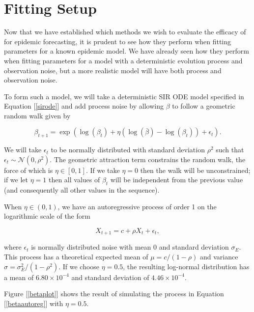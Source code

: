 

\section{Fitting Setup}

	Now that we have established which methods we wish to evaluate the efficacy of for epidemic forecasting, it is prudent to see how they perform when fitting parameters for a known epidemic model. We have already seen how they perform when fitting parameters for a model with a deterministic evolution process and observation noise, but a more realistic model will have both process and observation noise.

	To form such a model, we will take a deterministic SIR ODE model specified in Equation [\ref{sirode}] and add process noise by allowing $\beta$ to follow a geometric random walk given by

	\begin{equation}\label{betaautoreg}
		\beta_{t+1} = \exp \left( \log(\beta_{t}) + \eta (\log(\bar{\beta}) - \log(\beta_{t})) + \epsilon_{t} \right).
	\end{equation}

	We will take $\epsilon_{t}$ to be normally distributed with standard deviation $\rho^2$ such that $\epsilon_{t} \sim \mathcal{N}(0,\rho^2)$. The geometric attraction term constrains the random walk, the force of which is $\eta \in [0,1]$. If we take $\eta = 0$ then the walk will be unconstrained; if we let $\eta = 1$ then all values of $\beta_t$ will be independent from the previous value (and consequently all other values in the sequence).

	When $\eta \in (0,1)$, we have an autoregressive process of order 1 on the logarithmic scale of the form

	\begin{equation}
		X_{t+1} = c + \rho X_t + \epsilon_t ,
	\end{equation}

	where $\epsilon_t$ is normally distributed noise with mean 0 and standard deviation $\sigma_E$. This process has a theoretical expected mean of $\mu = c / (1 - \rho)$ and variance $\sigma = \sigma_E^2 / (1 - \rho^2)$. If we choose $\eta = 0.5$, the resulting log-normal distribution has a mean of $6.80 \times 10^{-4}$ and standard deviation of $4.46 \times 10^{-4}$.

	Figure [\ref{betaplot}] shows the result of simulating the process in Equation [\ref{betaautoreg}] with $\eta = 0.5$.

